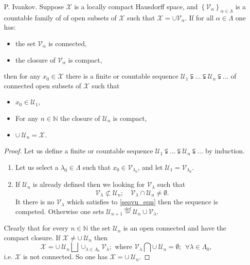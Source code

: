 \documentclass{beamer}
\theoremstyle{plain}
\newcommand{\be}{\begin{equation}}
\newcommand{\ee}{\end{equation}}
\newcommand{\sU}{\mathcal{U}}       %
\newcommand{\sV}{\mathcal{V}}       %
\newcommand{\sX}{\mathcal{X}}       %
\newcommand{\N}{\mathbb{N}}                  %
\renewcommand{\a}{\alpha}
\newcommand{\la}{\lambda}
\newcommand{\La}{\Lambda}
\newcommand{\bydef}{\stackrel{\mathrm{def}}{=}}
\begin{document}
\begin{frame}
\begin{lemma}
	\alert{P. Ivankov}. 	Suppose $\sX$ is a locally compact  Hausdorff space, and $\left\{\sV_\a \right\}_{\a \in  \La}$ is a  countable family of  of open subsets of $\sX$ such that  $\sX = \cup \sV_\a$. If for all $\a \in  \La$ one has:
	\begin{itemize}
	\item the set $\sV_\a$ is connected,
	\item the closure of $\sV_\a$ is compact,
\end{itemize}
then for any $x_0 \in \mathcal X$ there is a finite or countable sequence $\sU_1 \subsetneqq  ...\subsetneqq \sU_n\subsetneqq ...$ of connected open subsets of $\sX$ such that
\begin{itemize}
	\item $x_0 \in \sU_1$,
	\item  For any $n \in \N$ the closure of $\sU_n$ is compact,
	\item $\cup~ \sU_n = \sX$.
\end{itemize} 
\end{lemma}
\end{frame}
\begin{frame}
\begin{proof}
	Let us define a finite or countable sequence $\sU_1 \subsetneqq  ...\subsetneqq \sU_n\subsetneqq ...$ by induction.
	\begin{enumerate}
		\item Let us select a $\la_0 \in  \La$ such that $x_0 \in \sV_{\la_0}$, and let $\sU_1 = \sV_{\la_0}$.
		\item If $\sU_n$ is already defined then we looking for $\sV_\la$ such that
		\be\label{seqvu_eqn}
		\sV_\la \not\subset \sU_n;\quad
		\sV_\la \cap \sU_n \neq \emptyset.
		\ee
		It there is no $\sV_\la$ which satisfies to \eqref{seqvu_eqn} then the sequence is competed. Otherwise one sets $\sU_{n+1}\bydef \sU_n \cup \sV_\la$.
	\end{enumerate} 
	Clearly that for every $n \in \N$ the set $ \sU_n$ is an open connected and have the compact closure. If  $\sX \neq \cup~ \sU_n$ then 
	$$
	\sX  = \cup ~\sU_n \bigsqcup \cup_{\la \in  \La_0} \sV_\la; \text{ where } \sV_\la \bigcap \cup ~\sU_n = \emptyset; ~~ \forall \la \in  \La_0,
	$$ 
	i.e. $\sX$ is not connected. So one has $\sX = \cup~ \sU_n$.
\end{proof}

\end{frame}
\end{document}
